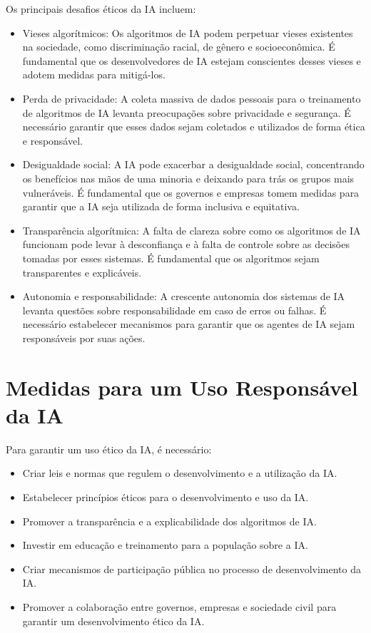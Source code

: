 \documentclass[12pt,twoside]{book}
\begin{document}
Os principais desafios éticos da IA incluem:
\begin{itemize}
    \item Vieses algorítmicos: Os algoritmos de IA podem perpetuar vieses existentes na sociedade, como discriminação racial, de gênero e socioeconômica. É fundamental que os desenvolvedores de IA estejam conscientes desses vieses e adotem medidas para mitigá-los.
    \item Perda de privacidade: A coleta massiva de dados pessoais para o treinamento de algoritmos de IA levanta preocupações sobre privacidade e segurança. É necessário garantir que esses dados sejam coletados e utilizados de forma ética e responsável.
    \item Desigualdade social: A IA pode exacerbar a desigualdade social, concentrando os benefícios nas mãos de uma minoria e deixando para trás os grupos mais vulneráveis. É fundamental que os governos e empresas tomem medidas para garantir que a IA seja utilizada de forma inclusiva e equitativa.
    \item Transparência algorítmica: A falta de clareza sobre como os algoritmos de IA funcionam pode levar à desconfiança e à falta de controle sobre as decisões tomadas por esses sistemas. É fundamental que os algoritmos sejam transparentes e explicáveis.
    \item Autonomia e responsabilidade: A crescente autonomia dos sistemas de IA levanta questões sobre responsabilidade em caso de erros ou falhas. É necessário estabelecer mecanismos para garantir que os agentes de IA sejam responsáveis por suas ações.
\end{itemize}

\section{Medidas para um Uso Responsável da IA}

Para garantir um uso ético da IA, é necessário:
\begin{itemize}
    \item Criar leis e normas que regulem o desenvolvimento e a utilização da IA.
    \item Estabelecer princípios éticos para o desenvolvimento e uso da IA.
    \item Promover a transparência e a explicabilidade dos algoritmos de IA.
    \item Investir em educação e treinamento para a população sobre a IA.
    \item Criar mecanismos de participação pública no processo de desenvolvimento da IA.
    \item Promover a colaboração entre governos, empresas e sociedade civil para garantir um desenvolvimento ético da IA.
\end{itemize}
\end{document}
